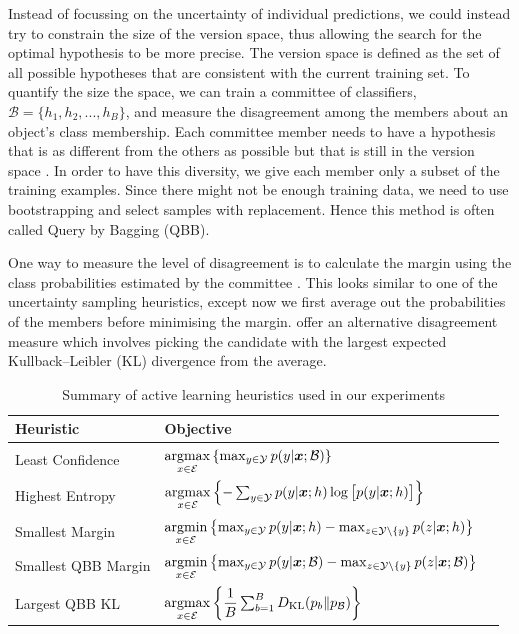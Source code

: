 \documentclass[fleqn,10pt,lineno]{wlpeerj} %
\newcommand{\B}{\mathcal{B}}
\newcommand{\Y}{\mathcal{Y}}
\newcommand{\Ecal}{\mathcal{E}}
\newcommand*{\argmin}{\operatornamewithlimits{argmin}\limits}
\newcommand*{\argmax}{\operatornamewithlimits{argmax}\limits}
\begin{document}
Instead of focussing on the uncertainty of individual predictions, we could
instead try to constrain the size of the version space, thus allowing the search for the optimal
hypothesis to be more precise. The version space is defined as the set of all possible hypotheses that are consistent with the current training set. To quantify the size the space, we can train a committee of
classifiers, $\B = \{h_1, h_2, ..., h_B\}$, and measure the disagreement among the members about an
object's class membership. Each committee member needs to have a hypothesis that is as different
from the others as possible but that is still in the version space \cite{melville04}. In order to
have this diversity, we give each member only a subset of the training examples. Since there might
not be enough training data, we need to use bootstrapping and select samples with replacement. Hence
this method is often called Query by Bagging (QBB).

One way to measure the level of disagreement is to calculate the margin using the class
probabilities estimated by the committee \cite{melville04}. This looks similar to one of the
uncertainty sampling heuristics, except now we first average out the probabilities of the members
before minimising the margin. \cite{mccallum98} offer an alternative disagreement measure which
involves picking the candidate with the largest expected Kullback--Leibler (KL) divergence from the average.

\begin{table}[h]
	\caption {Summary of active learning heuristics used in our experiments} \label{tab:heuristics}
	\centering
	\begin{tabular}{lll}
		\toprule
		{Heuristic}  &  Objective  \\
		\midrule
        Least Confidence &
			$\argmax_{x \in \Ecal} \left\{ \max_{y \in \Y} p(y | \bm{x}; \B) \right\}$
			\\
		Highest Entropy &
			$\argmax_{x \in \Ecal} \left\{-\sum_{y \in \Y} p(y | \bm{x}; h)
            \log \big[ p(y | \bm{x}; h) \big] \right\}$
			\\[2ex]
		Smallest Margin &
			$\argmin_{x \in \Ecal} \left\{ \max_{y \in \Y} p(y | \bm{x}; h) -
            \max_{z \in \Y \setminus \{y\}} p(z | \bm{x}; h)  \right\}$
			\\[2ex]
		Smallest QBB Margin &
			$\argmin_{x \in \Ecal} \left\{ \max_{y \in \Y} p(y | \bm{x}; \B) -
            \max_{z \in \Y \setminus \{y\}} p(z | \bm{x}; \B)  \right\}$
			\\[2ex]
		Largest QBB KL &
			$\argmax_{x \in \Ecal} \left\{ \dfrac{1}{B}
               \sum_{b=1}^B D_{\mathrm{KL}}(p_b\|p_\B) \right\}$
			\\
		\bottomrule
	\end{tabular}
\end{table}
\end{document}
